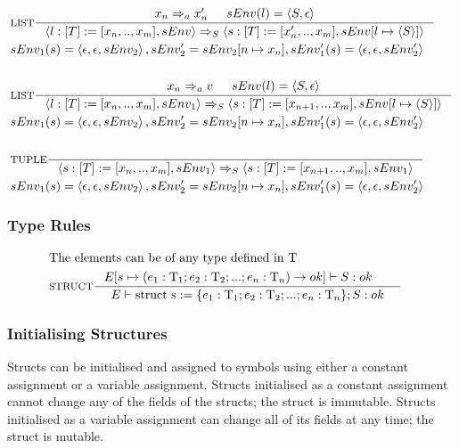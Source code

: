 \begin{align*}
&\inference[$\text{LIST}$]{x_n \Rightarrow_a x_n' & sEnv(l) = \Braket{S,\epsilon}}
                            {\Braket{l:[T] := [x_n,..,x_m],sEnv} \Rightarrow_S \Braket{s:[T] := [x_n',..,x_m],sEnv[l \mapsto \Braket{S}]}}
\\
&{sEnv_1(s) = \Braket{\epsilon,\epsilon,sEnv_2},sEnv_2' = sEnv_2[n \mapsto x_n],sEnv_1'(s) = \Braket{\epsilon,\epsilon,sEnv_2'}}
\\\\
&\inference[$\text{LIST}$]{x_n \Rightarrow_a v & sEnv(l) = \Braket{S,\epsilon}}
                            {\Braket{l:[T] := [x_n,..,x_m],sEnv_1} \Rightarrow_S \Braket{s:[T] := [x_{n+1},..,x_m],sEnv[l \mapsto \Braket{S}]}}
\\
&{sEnv_1(s) = \Braket{\epsilon,\epsilon,sEnv_2},sEnv_2' = sEnv_2[n \mapsto x_n],sEnv_1'(s) = \Braket{\epsilon,\epsilon,sEnv_2'}}
\\\\
&\inference[$\text{TUPLE}$]{}
                           {\Braket{s:[T] := [x_n,..,x_m],sEnv_1} \Rightarrow_S \Braket{s:[T] := [x_{n+1},..,x_m],sEnv_1}}
\\
&{sEnv_1(s) = \Braket{\epsilon,\epsilon,sEnv_2},sEnv_2' = sEnv_2[n \mapsto x_n],sEnv_1'(s) = \Braket{\epsilon,\epsilon,sEnv_2'}}
\end{align*}

\subsubsection{Type Rules}

\begin{align*}
\intertext{The elements can be of any type defined in $\Tt$}
&\inference[STRUCT]{E[s \mapsto (e_1:\Tt_1;e_2:\Tt_2;...;e_n:\Tt_n) \rightarrow ok]\vdash S : ok & }
                 {\Tenv \mathbin{\text{struct s}} := \{e_1:\Tt_1;e_2:\Tt_2;...;e_n:\Tt_n\}; S: ok}
\end{align*}



\subsubsection{Initialising Structures}
\label{sec:initStructures}

Structs can be initialised and assigned to symbols using either a constant assignment or a variable assignment. Structs initialised as a constant assignment cannot change any of the fields of the structs; the struct is immutable. Structs initialised as a variable assignment can change all of its fields at any time; the struct is mutable.

